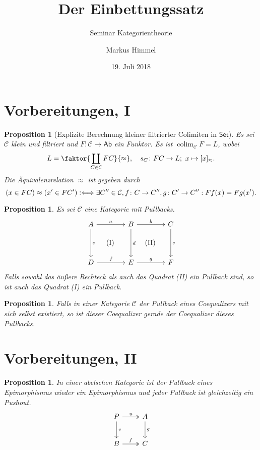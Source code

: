 \documentclass[a4paper, parskip=half]{scrartcl}
\subtitle{Seminar Kategorientheorie}
\title{Der Einbettungssatz}
\author{Markus Himmel}
\date{19. Juli 2018}
\theoremstyle{marginbreak}
\newtheorem{proposition}[remark]{Proposition}
\newcommand{\defiff}{\mathrel{\vcentcolon\Longleftrightarrow}}
\newcommand\ccat\mathsf
\newcommand\cat\mathcal
\DeclareMathOperator{\colim}{colim}
\begin{document}
	\maketitle
	\setcounter{section}{-2}

	\section{Vorbereitungen, I}
		\begin{proposition}[Explizite Berechnung kleiner filtrierter Colimiten in $\ccat{Set}$]
			Es sei $\cat{C}$ klein und filtriert und $F\colon \cat{C}\to\ccat{Ab}$ ein
			Funktor. Es ist $\colim_\cat{C} F = L$, wobei
			\[
				L=\faktor{\coprod_{C\in\cat{C}}FC}{\approx},\quad s_C\colon FC\to L;\ x\mapsto [x]_\approx.
			\]
			Die Äquivalenzrelation $\approx$ ist gegeben durch
			\[
				(x\in FC) \approx (x'\in FC') \defiff \exists C''\in\cat{C}, f\colon C\to C'', g\colon C'\to C'': Ff(x) = Fg(x').
			\]
		\end{proposition}
		\begin{proposition}
			Es sei $\cat{C}$ eine Kategorie mit Pullbacks.
			\[
				\begin{tikzcd}[sep=4em]
					A \ar{r}{a} \ar[phantom]{dr}{\text{(I)}} \ar{d}{c} & B \ar[phantom]{dr}{\text{(II)}} \ar{r}{b} \ar{d}{d} & C \ar{d}{e}\\
					D \ar{r}{f} & E \ar{r}{g} & F
				\end{tikzcd}
			\]
			Falls sowohl das äußere Rechteck als auch das Quadrat (II) ein Pullback sind, so ist
			auch das Quadrat (I) ein Pullback.
		\end{proposition}
		\begin{proposition}
			Falls in einer Kategorie $\cat{C}$ der Pullback eines Coequalizers mit sich
			selbst existiert, so ist dieser Coequalizer gerade der Coequalizer dieses Pullbacks.
		\end{proposition}

	\section{Vorbereitungen, II}
		\begin{proposition}
			In einer abelschen Kategorie ist der Pullback eines Epimorphismus wieder
			ein Epimorphismus und jeder Pullback ist gleichzeitig ein Pushout.
			\[
				\begin{tikzcd}[row sep=2.4em]
					P \arrow{d}{v} \arrow[two heads]{r}{u} & A \arrow{d}{g}\\
					B \arrow[two heads]{r}{f} & C
				\end{tikzcd}
			\]
		\end{proposition}
\end{document}
